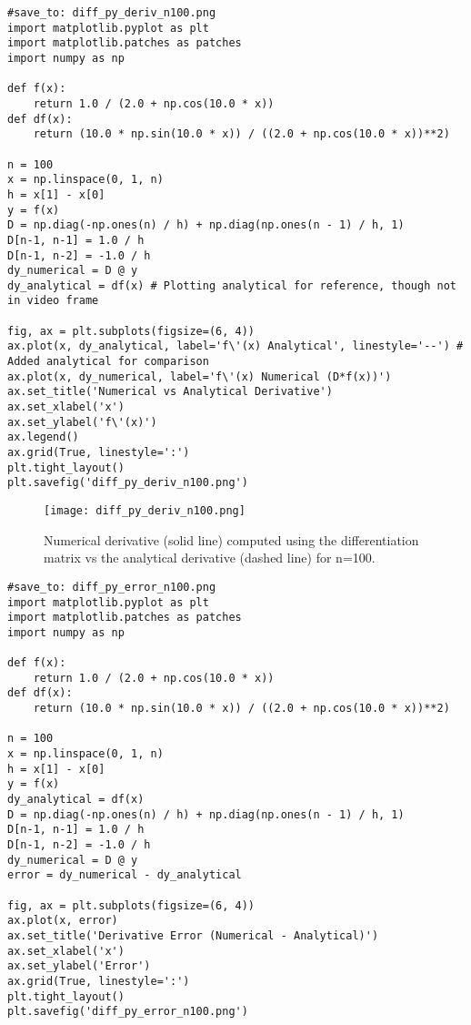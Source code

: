 \documentclass{article}
\begin{document}
\begin{verbatim}
#save_to: diff_py_deriv_n100.png
import matplotlib.pyplot as plt
import matplotlib.patches as patches
import numpy as np

def f(x):
    return 1.0 / (2.0 + np.cos(10.0 * x))
def df(x):
    return (10.0 * np.sin(10.0 * x)) / ((2.0 + np.cos(10.0 * x))**2)

n = 100
x = np.linspace(0, 1, n)
h = x[1] - x[0]
y = f(x)
D = np.diag(-np.ones(n) / h) + np.diag(np.ones(n - 1) / h, 1)
D[n-1, n-1] = 1.0 / h
D[n-1, n-2] = -1.0 / h
dy_numerical = D @ y
dy_analytical = df(x) # Plotting analytical for reference, though not in video frame

fig, ax = plt.subplots(figsize=(6, 4))
ax.plot(x, dy_analytical, label='f\'(x) Analytical', linestyle='--') # Added analytical for comparison
ax.plot(x, dy_numerical, label='f\'(x) Numerical (D*f(x))')
ax.set_title('Numerical vs Analytical Derivative')
ax.set_xlabel('x')
ax.set_ylabel('f\'(x)')
ax.legend()
ax.grid(True, linestyle=':')
plt.tight_layout()
plt.savefig('diff_py_deriv_n100.png')
\end{verbatim}

\begin{figure}[H]
\centering
\texttt{[image: diff\_py\_deriv\_n100.png]}
\caption{Numerical derivative (solid line) computed using the differentiation matrix vs the analytical derivative (dashed line) for n=100.}
\label{fig:diff_py_deriv_n100}
\end{figure}

\begin{verbatim}
#save_to: diff_py_error_n100.png
import matplotlib.pyplot as plt
import matplotlib.patches as patches
import numpy as np

def f(x):
    return 1.0 / (2.0 + np.cos(10.0 * x))
def df(x):
    return (10.0 * np.sin(10.0 * x)) / ((2.0 + np.cos(10.0 * x))**2)

n = 100
x = np.linspace(0, 1, n)
h = x[1] - x[0]
y = f(x)
dy_analytical = df(x)
D = np.diag(-np.ones(n) / h) + np.diag(np.ones(n - 1) / h, 1)
D[n-1, n-1] = 1.0 / h
D[n-1, n-2] = -1.0 / h
dy_numerical = D @ y
error = dy_numerical - dy_analytical

fig, ax = plt.subplots(figsize=(6, 4))
ax.plot(x, error)
ax.set_title('Derivative Error (Numerical - Analytical)')
ax.set_xlabel('x')
ax.set_ylabel('Error')
ax.grid(True, linestyle=':')
plt.tight_layout()
plt.savefig('diff_py_error_n100.png')
\end{verbatim}
\end{document}

